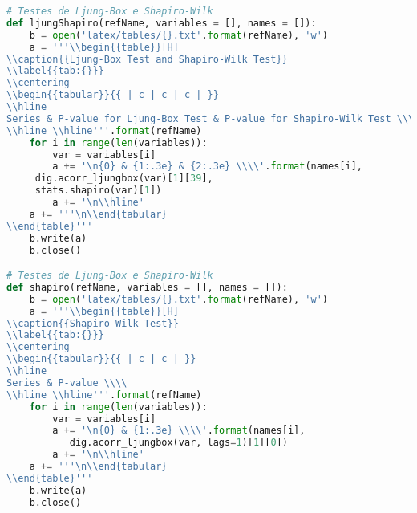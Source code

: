 \begin{lstlisting}[language=Python]
# Testes de Ljung-Box e Shapiro-Wilk
def ljungShapiro(refName, variables = [], names = []):
    b = open('latex/tables/{}.txt'.format(refName), 'w')
    a = '''\\begin{{table}}[H]
\\caption{{Ljung-Box Test and Shapiro-Wilk Test}}
\\label{{tab:{}}}
\\centering
\\begin{{tabular}}{{ | c | c | c | }}
\\hline
Series & P-value for Ljung-Box Test & P-value for Shapiro-Wilk Test \\\\
\\hline \\hline'''.format(refName)
    for i in range(len(variables)):
        var = variables[i]
        a += '\n{0} & {1:.3e} & {2:.3e} \\\\'.format(names[i],
     dig.acorr_ljungbox(var)[1][39],
     stats.shapiro(var)[1])
        a += '\n\\hline'
    a += '''\n\\end{tabular}
\\end{table}'''
    b.write(a)
    b.close()

# Testes de Ljung-Box e Shapiro-Wilk
def shapiro(refName, variables = [], names = []):
    b = open('latex/tables/{}.txt'.format(refName), 'w')
    a = '''\\begin{{table}}[H]
\\caption{{Shapiro-Wilk Test}}
\\label{{tab:{}}}
\\centering
\\begin{{tabular}}{{ | c | c | }}
\\hline
Series & P-value \\\\
\\hline \\hline'''.format(refName)
    for i in range(len(variables)):
        var = variables[i]
        a += '\n{0} & {1:.3e} \\\\'.format(names[i],
           dig.acorr_ljungbox(var, lags=1)[1][0])
        a += '\n\\hline'
    a += '''\n\\end{tabular}
\\end{table}'''
    b.write(a)
    b.close()


\end{lstlisting}
